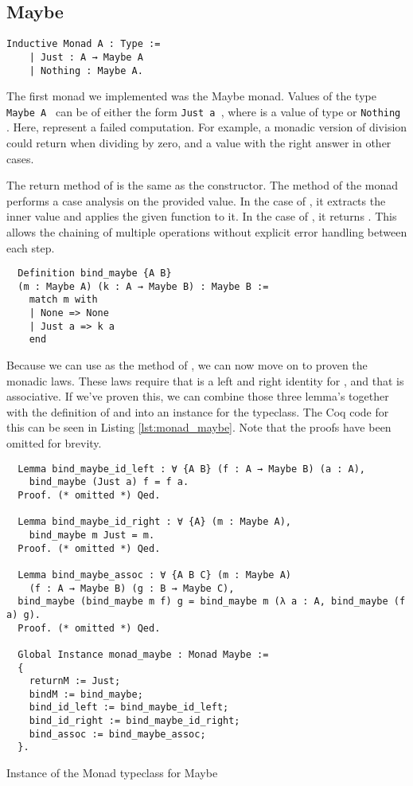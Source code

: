\subsection{Maybe}
\begin{verbatim}
Inductive Monad A : Type :=
    | Just : A → Maybe A
    | Nothing : Maybe A.
\end{verbatim}

The first monad we implemented was the Maybe monad. Values of the type
\texttt{Maybe A } can be of either the form 
\texttt{Just a }, where  is a value of type  or 
\texttt{Nothing }. Here,  represent a failed
computation. For example, a monadic version of division  could return  when dividing by zero,
and a  value with the right answer in other cases.

The return method of  is the same as the  constructor. 
The  method of the  monad performs a case analysis on the provided
value. In the case of , it extracts the inner value and applies the given
function to it. In the case of , it returns . This allows the chaining
of multiple operations without explicit error handling between each step.

\begin{verbatim}
  Definition bind_maybe {A B} 
  (m : Maybe A) (k : A → Maybe B) : Maybe B :=
    match m with
    | None => None
    | Just a => k a
    end
\end{verbatim}

Because we can use  as the  method of , we
can now move on to proven the monadic laws. These laws require that
 is a left and right identity for , and that  is associative. If we've proven this, we can combine those three lemma's
together with the definition of  and  into an
instance for the  typeclass. The Coq code for this can be seen in
Listing \ref{lst:monad_maybe}. Note that the proofs have been omitted for
brevity.

\begin{listing}
\begin{verbatim}
  Lemma bind_maybe_id_left : ∀ {A B} (f : A → Maybe B) (a : A), 
    bind_maybe (Just a) f = f a.
  Proof. (* omitted *) Qed.

  Lemma bind_maybe_id_right : ∀ {A} (m : Maybe A), 
    bind_maybe m Just = m.
  Proof. (* omitted *) Qed.

  Lemma bind_maybe_assoc : ∀ {A B C} (m : Maybe A) 
    (f : A → Maybe B) (g : B → Maybe C),
  bind_maybe (bind_maybe m f) g = bind_maybe m (λ a : A, bind_maybe (f a) g).
  Proof. (* omitted *) Qed.

  Global Instance monad_maybe : Monad Maybe :=
  {
    returnM := Just;
    bindM := bind_maybe;
    bind_id_left := bind_maybe_id_left;
    bind_id_right := bind_maybe_id_right;
    bind_assoc := bind_maybe_assoc;
  }. 
\end{verbatim}
\caption{Instance of the Monad typeclass for Maybe}
\label{lst:monad_maybe}
\end{listing}

